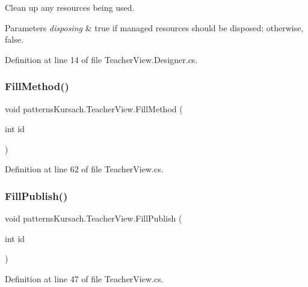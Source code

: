 Clean up any resources being used. 


\begin{DoxyParams}{Parameters}
{\em disposing} & true if managed resources should be disposed; otherwise, false.\\
\hline
\end{DoxyParams}


Definition at line 14 of file Teacher\+View.\+Designer.\+cs.

\mbox{\label{classpatterns_kursach_1_1_teacher_view_a3a143c68f1bdb8540beb11f023a969dc}} 
\subsubsection{\texorpdfstring{Fill\+Method()}{FillMethod()}}
{\footnotesize\ttfamily void patterns\+Kursach.\+Teacher\+View.\+Fill\+Method (\begin{DoxyParamCaption}\item[{int}]{id }\end{DoxyParamCaption})}



Definition at line 62 of file Teacher\+View.\+cs.

\mbox{\label{classpatterns_kursach_1_1_teacher_view_a2ab40a41ea53ff51d414a0baa237ec4b}} 
\subsubsection{\texorpdfstring{Fill\+Publish()}{FillPublish()}}
{\footnotesize\ttfamily void patterns\+Kursach.\+Teacher\+View.\+Fill\+Publish (\begin{DoxyParamCaption}\item[{int}]{id }\end{DoxyParamCaption})}



Definition at line 47 of file Teacher\+View.\+cs.

